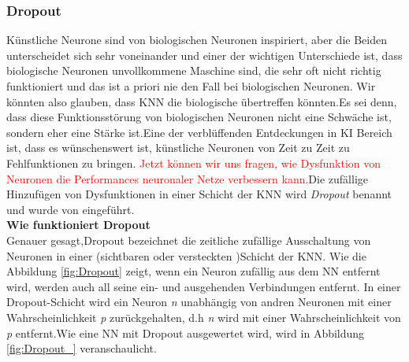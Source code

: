\documentclass[12pt,a4paper]{scrartcl}
\numberwithin{equation}{section}
\begin{document}
\subsubsection{Dropout}
Künstliche Neurone sind von biologischen Neuronen inspiriert, aber die Beiden unterscheidet sich sehr voneinander und einer der wichtigen Unterschiede ist, dass biologische Neuronen unvollkommene Maschine sind, die sehr oft nicht richtig funktioniert und das ist a priori nie den Fall bei  biologischen Neuronen. Wir könnten also glauben, dass \ac{KNN} die biologische übertreffen könnten.Es sei denn, dass diese Funktionsstörung von biologischen Neuronen nicht eine Schwäche ist, sondern eher eine Stärke ist.Eine der verblüffenden Entdeckungen in \ac{KI} Bereich ist, dass es wünschenswert ist, künstliche Neuronen von Zeit zu Zeit zu Fehlfunktionen zu bringen\cite{1}. \textcolor{red}{Jetzt können wir uns fragen, wie Dysfunktion von Neuronen die Performances neuronaler Netze verbessern kann}.Die zufällige Hinzufügen von Dysfunktionen in einer Schicht der \ac{KNN} wird \textit{Dropout} benannt und wurde von \cite[Geoffrey E. et al]{2} eingeführt.\\
\textbf{Wie funktioniert Dropout}\\
Genauer gesagt,Dropout bezeichnet die zeitliche zufällige Ausschaltung von Neuronen in einer (sichtbaren oder versteckten )Schicht der \ac{KNN}. Wie die Abbildung \ref{fig:Dropout} zeigt, wenn ein Neuron zufällig aus dem \ac{NN} entfernt wird, werden auch all seine ein- und ausgehenden Verbindungen entfernt.
In einer Dropout-Schicht wird ein Neuron \textit{n} unabhängig von andren Neuronen mit einer Wahrscheinlichkeit \textit{p} zurückgehalten, d.h \textit{n} wird mit einer Wahrscheinlichkeit von \textit{p} entfernt.Wie eine NN mit Dropout ausgewertet wird, wird in Abbildung \ref{fig:Dropout_} veranschaulicht.\cite{3}
\end{document}
